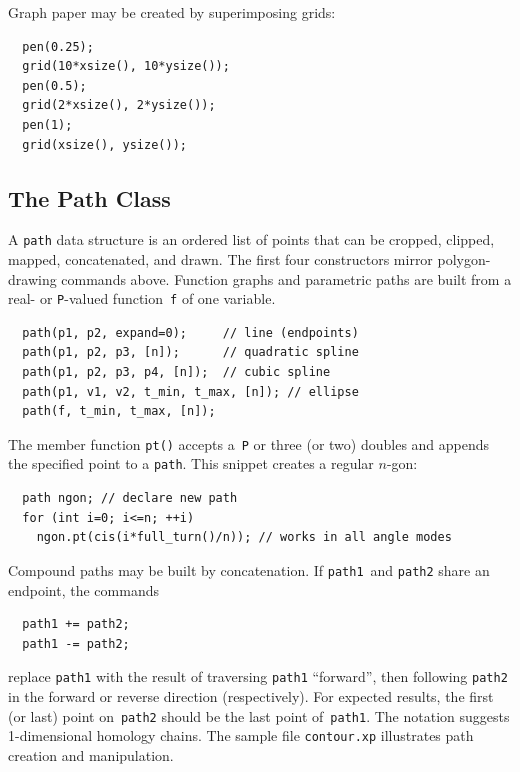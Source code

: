 \documentclass[12pt,letterpaper]{book}
\newcommand{\code}[1]{\texttt{#1}}
\newcommand{\filename}[1]{\texttt{#1}}
\newcommand{\texicomment}{}
\newcommand{\texicommentend}{}
\newcommand{\teximath}[1]{$#1$}
\newcommand{\findex}[1]{\ignorespaces}
\begin{document}
Graph paper may be created by superimposing grids:
\texicomment
\begin{center}
  \begin{minipage}[b]{2.5in}
    \begin{footnotesize}
\texicommentend
\findex{pen}
\findex{grid}
\begin{verbatim}
  pen(0.25);
  grid(10*xsize(), 10*ysize());
  pen(0.5);
  grid(2*xsize(), 2*ysize());
  pen(1);
  grid(xsize(), ysize());
\end{verbatim}
\texicomment
    \end{footnotesize}
  \end{minipage}
  \qquad
  
\end{center}
\texicommentend

\subsection{The Path Class}

A \code{path} data structure is an ordered list of points that can be
cropped, clipped, mapped, concatenated, and drawn.  The first four
constructors mirror polygon-drawing commands above.  Function graphs
and parametric paths are built from a real- or \code{P}-valued
function~\code{f} of one variable.
\findex{path}
\begin{verbatim}
  path(p1, p2, expand=0);     // line (endpoints)
  path(p1, p2, p3, [n]);      // quadratic spline
  path(p1, p2, p3, p4, [n]);  // cubic spline
  path(p1, v1, v2, t_min, t_max, [n]); // ellipse
  path(f, t_min, t_max, [n]);
\end{verbatim}

The member function \code{pt()} accepts a~\code{P} or three (or two)
doubles and appends the specified point to a \code{path}.  This
snippet creates a regular \teximath{n}-gon:
\begin{verbatim}
  path ngon; // declare new path
  for (int i=0; i<=n; ++i)
    ngon.pt(cis(i*full_turn()/n)); // works in all angle modes
\end{verbatim}
Compound paths may be built by concatenation.  If \code{path1}~and
\code{path2} share an endpoint, the commands
\begin{verbatim}
  path1 += path2;
  path1 -= path2;
\end{verbatim}
replace \code{path1} with the result of traversing \code{path1}
``forward'', then following \code{path2} in the forward or reverse
direction (respectively). For expected results, the first
(or last) point on~\code{path2} should be the last point
of~\code{path1}. The notation suggests 1-dimensional homology
chains. The sample file \filename{contour.xp} illustrates path
creation and manipulation.
\end{document}
